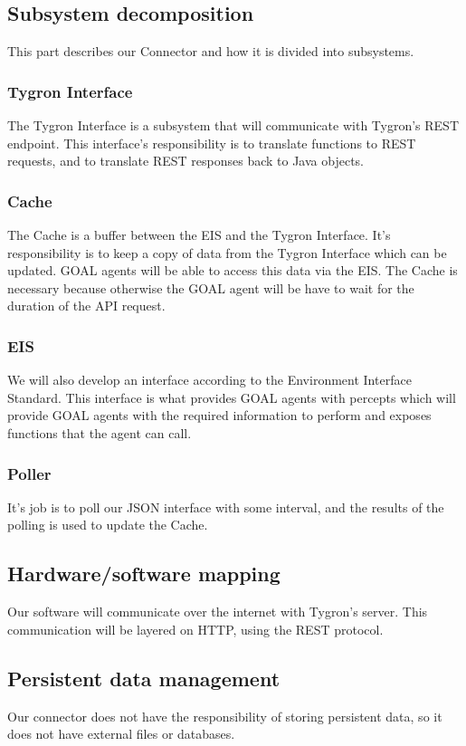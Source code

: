 \documentclass[a4paper]{article}
\begin{document}
\subsection{Subsystem decomposition}
This part describes our Connector and how it is divided into subsystems.

\subsubsection{Tygron Interface}
The Tygron Interface is a subsystem that will communicate with Tygron’s REST endpoint. This interface’s responsibility is to translate functions to REST requests, and to translate REST responses back to Java objects.

\subsubsection{Cache}
The Cache is a buffer between the EIS and the Tygron Interface. It’s responsibility is to keep a copy of data from the Tygron Interface which can be updated. GOAL agents will be able to access this data via the EIS. The Cache is necessary because otherwise the GOAL agent will be have to wait for the duration of the API request.

\subsubsection{EIS}
We will also develop an interface according to the Environment Interface Standard. This interface is what provides GOAL agents with percepts which will provide GOAL agents with the required information to perform and exposes functions that the agent can call.

\subsubsection{Poller}
It’s job is to poll our JSON interface with some interval, and the results of the polling is used to update the Cache. 

\subsection{Hardware/software mapping}
Our software will communicate over the internet with Tygron’s server. This communication will be layered on HTTP, using the REST protocol.

\subsection{Persistent data management}
Our connector does not have the responsibility of storing persistent data, so it does not have external files or databases.
\end{document}

